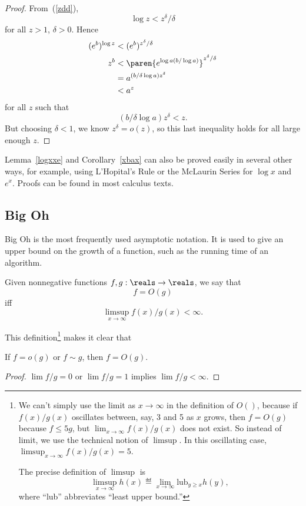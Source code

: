 \begin{proof}
From~(\ref{zdd}),
\[   %
\log z  <  z^{\delta}/\delta
\]   %
for all $z>1$, $\delta >0$.  
Hence
\begin{align*}
(e^b)^{\log z} & <  (e^b)^{z^{\delta}/\delta}\\ %
z^b & < \paren{e^{\log a (b/\log a)}}^{z^{\delta}/\delta}\\ %
    & =  a^{(b/\delta\log a) z^{\delta}}\\ %
    & <  a^z  %
\end{align*}
for all $z$ such that
\[
(b/\delta\log a) z^{\delta} <z.
\]
But choosing $\delta < 1$, we know $z^{\delta} = o(z)$, so this last
inequality holds for all large enough $z$.
\end{proof}

Lemma~\ref{logxxe} and Corollary~\ref{xbax} can also be proved easily in
several other ways, for example, using L'Hopital's Rule or the McLaurin
Series for $\log x$ and $e^x$.  Proofs can be found in most calculus
texts.

\subsection{Big Oh}

Big Oh is the most frequently used asymptotic notation.  It is used to
give an upper bound on the growth of a function, such as the running
time of an algorithm.
\begin{definition}
Given nonnegative functions $f, g : \reals \to \reals$, we
say that
\[
f = O(g)
\]
iff
\[
\limsup_{x \rightarrow \infty} f(x)/g(x) < \infty.
\]
\end{definition}
This definition\footnote{We can't simply use the limit as
$x \rightarrow \infty$ in the definition of $O()$, because if
$f(x)/g(x)$ oscillates between, say, 3 and 5 as $x$ grows, then $f =
O(g)$ because $f
\leq 5g$, but $\lim_{x \rightarrow \infty} f(x)/g(x)$ does not exist.
So instead of limit, we use the technical notion of $\limsup$.  In
this oscillating case, $\limsup_{x \rightarrow \infty} f(x)/g(x) = 5$.

The precise definition of $\limsup$ is
\[
\limsup_{x \rightarrow \infty} h(x) \eqdef \lim_{x \rightarrow \infty}
\text{lub}_{y \geq x} h(y),
\]
where ``lub'' abbreviates ``least upper bound.''} makes it clear that
\begin{lemma}\label{osimO}
If $f = o(g)$ or $f \sim g$, then $f = O(g)$.
\end{lemma}
\begin{proof}
$\lim f/g=0$ or $\lim f/g=1$ implies $\lim f/g<\infty$.
\end{proof}


